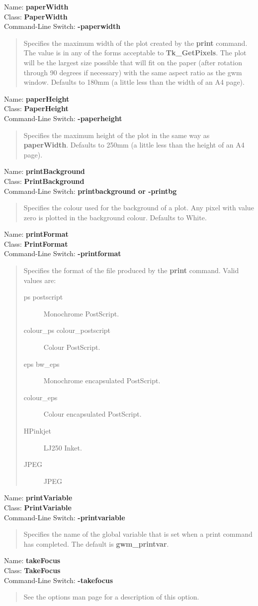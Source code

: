 \documentclass[twoside,11pt,nolof]{starlink}
\providecommand{\option}[3]{\par
Name: {\textbf{#1}} \\
Class: {\textbf{#2}} \\
Command-Line Switch: {\textbf{#3}} }
\newenvironment{rquote}{\begin{quote}\raggedright}{\end{quote}}
\begin{document}
\option{paperWidth}{PaperWidth}{-paperwidth}
\begin{rquote}
Specifies the maximum width of the plot created by the \textbf{print} command.
The value is in any of the forms acceptable to \textbf{Tk\_GetPixels}. The
plot will be the largest size possible that will fit on the paper (after
rotation through 90 degrees if necessary) with the same aspect ratio
as the gwm window. Defaults to 180mm (a little less than the width of an
A4 page).
\end{rquote}

\option{paperHeight}{PaperHeight}{-paperheight}
\begin{rquote}
Specifies the maximum height of the plot in the same way as \textbf{paperWidth}.
Defaults to 250mm (a little less than the height of an A4 page).
\end{rquote}

\option{printBackground}{PrintBackground}{printbackground {\rm or} -printbg}
\begin{rquote}
Specifies the colour used for the background of a plot. Any pixel with
value zero is plotted in the background colour. Defaults to White.
\end{rquote}

\option{printFormat}{PrintFormat}{-printformat}
\begin{rquote}
Specifies the format of the file produced by the \textbf{print} command. Valid
values are:
\begin{description}
\item[ps postscript] Monochrome PostScript.
\item[colour\_ps colour\_postscript] Colour PostScript.
\item[eps bw\_eps] Monochrome encapsulated PostScript.
\item[colour\_eps] Colour encapsulated PostScript.
\item[HPinkjet] LJ250 Inket.
\item[JPEG] JPEG
\end{description}
\end{rquote}

\option{printVariable}{PrintVariable}{-printvariable}
\begin{rquote}
Specifies the name of the global variable that is set when a print command
has completed. The default is \textbf{gwm\_printvar}.
\end{rquote}

\option{takeFocus}{TakeFocus}{-takefocus}
\begin{rquote}
See the options man page for a description of this option.
\end{rquote}
\end{document}
